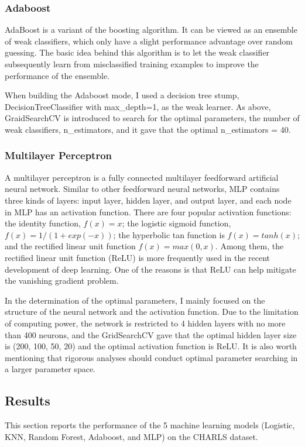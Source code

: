 \documentclass[12pt]{article}
\begin{document}
\subsubsection{Adaboost}
AdaBoost is a variant of the boosting algorithm. It can be viewed as an ensemble of weak classifiers, which only have a slight performance advantage over random guessing. The basic idea behind this algorithm is to let the weak classifier subsequently learn from misclassified training examples to improve the performance of the ensemble.

When building the Adaboost mode, I used a decision tree stump, DecisionTreeClassifier with max\_depth=1, as the weak learner. As above, GraidSearchCV is introduced to search for the optimal parameters, the number of weak classifiers, n\_estimators, and it gave that the optimal n\_estimators = 40.


\subsubsection{Multilayer Perceptron}
A multilayer perceptron is a fully connected multilayer feedforward artificial neural network. Similar to other feedforward neural networks, MLP contains three kinds of layers: input layer, hidden layer, and output layer, and each node in MLP has an activation function. There are four popular activation functions: the identity function, $f(x) = x$; the logistic sigmoid function, $f(x) = 1 / (1 + exp(-x))$; the hyperbolic tan function is $f(x) = tanh(x)$; and the rectified linear unit function $f(x) = max(0, x)$. Among them, the rectified linear unit function (ReLU) is more frequently used in the recent development of deep learning. One of the reasons is that ReLU can help mitigate the vanishing gradient problem.

In the determination of the optimal parameters, I mainly focused on the structure of the neural network and the activation function. Due to the limitation of computing power, the network is restricted to 4 hidden layers with no more than 400 neurons, and the GridSearchCV gave that the optimal hidden layer size is (200, 100, 50, 20) and the optimal activation function is ReLU. It is also worth mentioning that rigorous analyses should conduct optimal parameter searching in a larger parameter space.
\subsection{Results}
\par This section reports the performance of the 5 machine learning models (Logistic, KNN, Random Forest, Adaboost, and MLP) on the CHARLS dataset.
\end{document}
